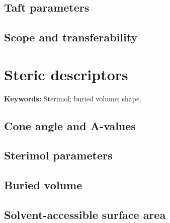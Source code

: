 
\subsection{Taft parameters}


\subsection{Scope and transferability}


\section{Steric descriptors}

\begin{methodbox}
\textbf{Keywords:} Sterimol; buried volume; shape.
\end{methodbox}

\subsection{Cone angle and A-values}


\subsection{Sterimol parameters}


\subsection{Buried volume}


\subsection{Solvent-accessible surface area}



